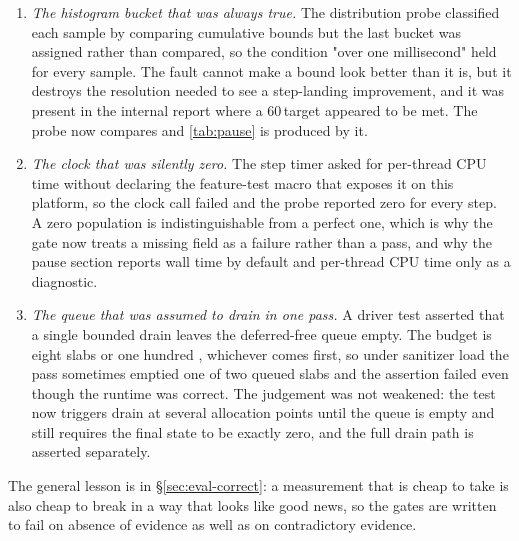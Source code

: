 \begin{enumerate}
\item \emph{The histogram bucket that was always true.}  The distribution probe classified each
sample by comparing cumulative bounds but the last bucket was assigned rather than compared, so the
condition "over one millisecond" held for every sample.  The fault cannot make a bound look better
than it is, but it destroys the resolution needed to see a step-landing improvement, and it was
present in the internal report where a 60\,\us target appeared to be met.  The probe now compares and
\tab\ref{tab:pause} is produced by it.
\item \emph{The clock that was silently zero.}  The step timer asked for per-thread CPU time without
declaring the feature-test macro that exposes it on this platform, so the clock call failed and the
probe reported zero for every step.  A zero population is indistinguishable from a perfect one, which
is why the gate now treats a missing field as a failure rather than a pass, and why the pause section
reports wall time by default and per-thread CPU time only as a diagnostic.
\item \emph{The queue that was assumed to drain in one pass.}  A driver test asserted that a single
bounded drain leaves the deferred-free queue empty.  The budget is eight slabs or one hundred
\us, whichever comes first, so under sanitizer load the pass sometimes emptied one of two queued
slabs and the assertion failed even though the runtime was correct.  The judgement was not weakened:
the test now triggers drain at several allocation points until the queue is empty and still requires
the final state to be exactly zero, and the full drain path is asserted separately.
\end{enumerate}

The general lesson is in \S\ref{sec:eval-correct}: a measurement that is cheap to take is also cheap
to break in a way that looks like good news, so the gates are written to fail on absence of evidence
as well as on contradictory evidence.
